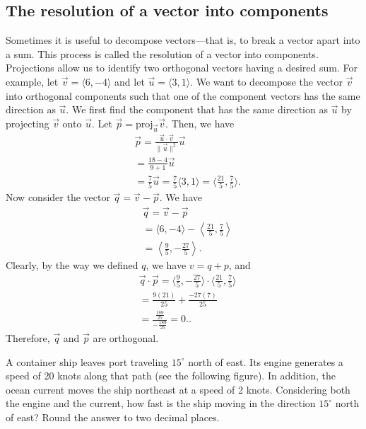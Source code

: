 \documentclass{report}
\begin{document}
    \bigbreak \noindent 
    \subsection{The resolution of a vector into components}
    \bigbreak \noindent 
    Sometimes it is useful to decompose vectors---that is, to break a vector apart into a sum. This process is called the resolution of a vector into components. Projections allow us to identify two orthogonal vectors having a desired sum. For example, let $\vec{v} = \langle 6, -4 \rangle$ and let $\vec{u} = \langle 3, 1 \rangle$. We want to decompose the vector $\vec{v}$ into orthogonal components such that one of the component vectors has the same direction as $\vec{u}$.
    \bigbreak \noindent 
    We first find the component that has the same direction as $\vec{u}$ by projecting $\vec{v}$ onto $\vec{u}$. Let $\vec{p} = \text{proj}_{\vec{u}}\vec{v}$. Then, we have
    \bigbreak \noindent 
    \begin{align*}
        &\vec{p} = \frac{\vec{u} \cdot \vec{v}}{\|\vec{u}\|^2} \vec{u}  \\
        &=\frac{18-4}{9+1}\vec{u} \\
        &=\frac{7}{5}\vec{u} = \frac{7}{5}\langle 3,1\rangle = \langle \frac{21}{5}, \frac{7}{5}\rangle
    .\end{align*}
    Now consider the vector $\vec{q} = \vec{v} - \vec{p}$. We have
    \begin{align*}
        &\vec{q} = \vec{v} - \vec{p} \\
        &=\langle 6,-4 \rangle - \left\langle \frac{21}{5}, \frac{7}{5} \right\rangle \\
        &=\left\langle \frac{9}{5}, -\frac{27}{5} \right\rangle
    .\end{align*}
    \bigbreak \noindent 
    Clearly, by the way we defined $q$, we have $v = q + p$, and
    \begin{align*}
         &\vec{q} \cdot \vec{p} = \langle \frac{9}{5}, -\frac{27}{5} \rangle \cdot \langle \frac{21}{5}, \frac{7}{5} \rangle \\
         &= \frac{9(21)}{25} + \frac{-27(7)}{25} \\
         &= \frac{\frac{189}{25}}{-\frac{189}{25}} = 0. 
    .\end{align*}
    \bigbreak \noindent 
    Therefore, $\vec{q}$ and $\vec{p}$ are orthogonal.
    \bigbreak \noindent 
    \begin{exm}
        A container ship leaves port traveling  $15^{\circ}$
  north of east. Its engine generates a speed of 20 knots along that path (see the following figure). In addition, the ocean current moves the ship northeast at a speed of 2 knots. Considering both the engine and the current, how fast is the ship moving in the direction  $15^{\circ} $
  north of east? Round the answer to two decimal places.
  \bigbreak \noindent 
        
    \end{exm}
\end{document}
